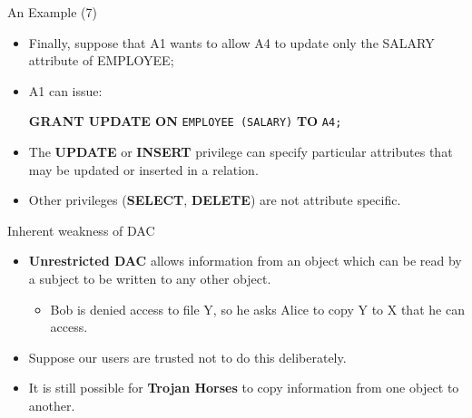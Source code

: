 \begin{frame}{An Example (7)}
    \Large
    \begin{itemize}
        \vspace{-1.5cm}
        \item Finally, suppose that A1 wants to allow A4 to update only the SALARY attribute of EMPLOYEE;
        \item A1 can issue:
        
        \vspace{0.2cm}
        {
            \normalsize \color{red!70!black}
            \textbf{GRANT UPDATE ON} \texttt{EMPLOYEE (SALARY)} \textbf{TO} \texttt{A4;}
        }
        \vspace{0.2cm}
        
        \item The \textbf{UPDATE} or \textbf{INSERT} privilege can specify particular attributes that may be updated or inserted in a relation.
        
        \item Other privileges (\textbf{SELECT}, \textbf{DELETE}) are not attribute specific.
    \end{itemize}
\end{frame}

\begin{frame}{Inherent weakness of DAC}
    \Large
    \begin{itemize}
        \vspace{-1.5cm}
        \item \textbf{Unrestricted DAC} allows information from an object which can be read by a subject to be written to any other object.
        
        \begin{itemize}
            \large
            \item Bob is denied access to file Y, so he asks Alice to copy Y to X that he can access.
        \end{itemize}
        
        \item Suppose our users are trusted not to do this deliberately.
        
        \item It is still possible for \textbf{Trojan Horses} to copy information from one object to another.
    \end{itemize}
\end{frame}


